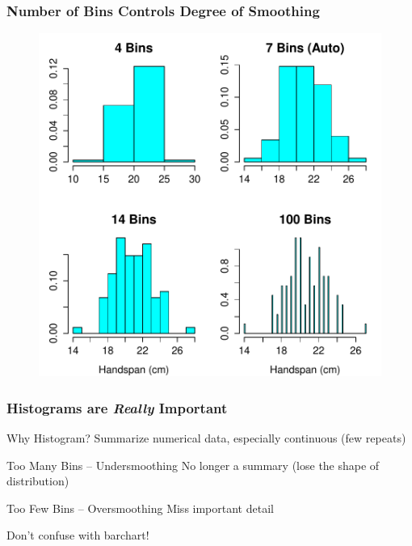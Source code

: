 \begin{frame}
\frametitle{Number of Bins Controls Degree of Smoothing}
\begin{figure}
\includegraphics[scale = 0.53]{./images/handspan_four_histograms}
\end{figure}
\end{frame}
\begin{frame}
\frametitle{Histograms are \emph{Really} Important}

\begin{block}{Why Histogram?}
Summarize numerical data, especially continuous (few repeats)
\end{block}
\pause
\begin{block}{Too Many Bins -- Undersmoothing}
No longer a summary (lose the shape of distribution)
\end{block}
\pause
\begin{block}{Too Few Bins -- Oversmoothing}
Miss important detail
\end{block}
\pause
\begin{alertblock}{Don't confuse with barchart!}
\end{alertblock}
\end{frame}



